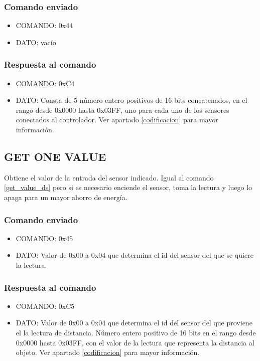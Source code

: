 \documentclass[a4paper,10pt]{article}
\begin{document}
\subsubsection*{Comando enviado}

\begin{itemize}
	\item{COMANDO:} 0x44
	\item{DATO:} vac\'io
\end{itemize}

\subsubsection*{Respuesta al comando}

\begin{itemize}
	\item{COMANDO:} 0xC4
	\item{DATO:} Consta de 5 n\'umero entero positivos de 16 bits concatenados, en el rango desde 0x0000 hasta 0x03FF,
		uno para cada uno de los sensores conectados al controlador.
		Ver apartado \ref{codificacion} para mayor informaci\'on.
\end{itemize}

\subsection{GET ONE VALUE}
\label{get_one_value_ds}

Obtiene el valor de la entrada del sensor indicado.
Igual al comando \ref{get_value_ds} pero si es necesario enciende el sensor, toma la lectura y luego lo apaga para un mayor ahorro de energ\'ia.

\subsubsection*{Comando enviado}

\begin{itemize}
	\item{COMANDO:} 0x45
	\item{DATO:} Valor de 0x00 a 0x04 que determina el id del sensor del que se quiere la lectura.
\end{itemize}

\subsubsection*{Respuesta al comando}

\begin{itemize}
	\item{COMANDO:} 0xC5
	\item{DATO:} Valor de 0x00 a 0x04 que determina el id del sensor del que proviene el la lectura de distancia.
		N\'umero entero positivo de 16 bits en el rango desde 0x0000 hasta 0x03FF, con el valor de la lectura que representa la distancia al objeto.
		Ver apartado \ref{codificacion} para mayor informaci\'on.
\end{itemize}
\end{document}
